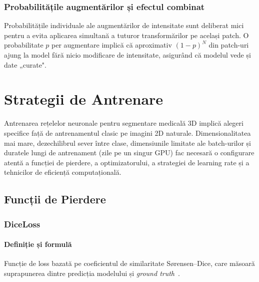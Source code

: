 \documentclass[12pt, a4paper]{report}
\begin{document}
\subsection{Probabilitățile augmentărilor și efectul combinat}

Probabilitățile individuale ale augmentărilor de intensitate sunt deliberat mici pentru
a evita aplicarea simultană a tuturor transformărilor pe același patch. O probabilitate
$p$ per augmentare implică că aproximativ $(1-p)^N$ din patch-uri ajung la model fără
nicio modificare de intensitate, asigurând că modelul vede și date „curate".

\chapter{Strategii de Antrenare}

Antrenarea rețelelor neuronale pentru segmentare medicală 3D implică alegeri specifice
față de antrenamentul clasic pe imagini 2D naturale. Dimensionalitatea mai mare,
dezechilibrul sever între clase, dimensiunile limitate ale batch-urilor și duratele
lungi de antrenament (zile pe un singur GPU) fac necesară o configurare atentă
a funcției de pierdere, a optimizatorului, a strategiei de learning rate și a
tehnicilor de eficiență computațională.

\section{Funcții de Pierdere}

\subsection{DiceLoss}
\label{sec:diceloss}

\subsubsection{Definiție și formulă}

\vspace{4pt}
\begin{infobox}
Funcție de loss bazată pe coeficientul de similaritate Sørensen--Dice,
care măsoară suprapunerea dintre predicția modelului și \textit{ground truth}~\cite{milletari2016vnet}.
\end{infobox}
\end{document}
